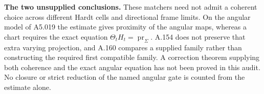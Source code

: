 \textbf{The two unsupplied conclusions.}\quad
These matchers need not admit a coherent choice across different
Hardt cells and directional frame limits.  On the angular model of
A5.019 the estimate gives proximity of the angular maps, whereas a
chart requires the exact equation
\(\Theta_t H_t=\operatorname{pr}_{\Sigma}\).
A.154 does not preserve that extra varying projection, and A.160
compares a supplied family rather than constructing the required
first compatible family.  A correction theorem supplying both
coherence and the exact angular equation has not been proved in
this audit.  No closure or strict reduction of the named angular
gate is counted from the estimate alone.
